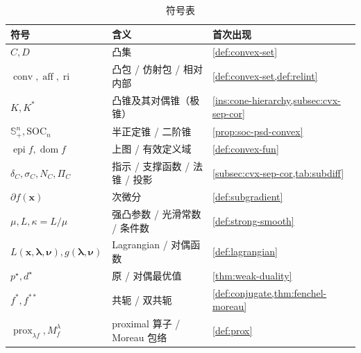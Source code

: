 \begin{table}[H]\centering\small
\caption{符号表}
\label{tab:cvx-symbols}
\begin{tabular}{lll}
\toprule
符号 & 含义 & 首次出现 \\
\midrule
$C,D$ & 凸集 & \cref{def:convex-set} \\
$\operatorname{conv},\operatorname{aff},\operatorname{ri}$ & 凸包 / 仿射包 / 相对内部 & \cref{def:convex-set,def:relint} \\
$K,K^\ast$ & 凸锥及其对偶锥（极锥） & \cref{ins:cone-hierarchy,subsec:cvx-sep-cor} \\
$\mathbb{S}^n_+,\mathrm{SOC}_n$ & 半正定锥 / 二阶锥 & \cref{prop:soc-psd-convex} \\
$\operatorname{epi}f,\operatorname{dom}f$ & 上图 / 有效定义域 & \cref{def:convex-fun} \\
$\delta_C,\sigma_C,N_C,\Pi_C$ & 指示 / 支撑函数 / 法锥 / 投影 & \cref{subsec:cvx-sep-cor,tab:subdiff} \\
$\partial f(\mathbf x)$ & 次微分 & \cref{def:subgradient} \\
$\mu,L,\kappa=L/\mu$ & 强凸参数 / 光滑常数 / 条件数 & \cref{def:strong-smooth} \\
$L(\mathbf x,\boldsymbol\lambda,\boldsymbol\nu),g(\boldsymbol\lambda,\boldsymbol\nu)$ & Lagrangian / 对偶函数 & \cref{def:lagrangian} \\
$p^\star,d^\star$ & 原 / 对偶最优值 & \cref{thm:weak-duality} \\
$f^\ast,f^{\ast\ast}$ & 共轭 / 双共轭 & \cref{def:conjugate,thm:fenchel-moreau} \\
$\operatorname{prox}_{\lambda f},M_f^\lambda$ & proximal 算子 / Moreau 包络 & \cref{def:prox} \\
\bottomrule
\end{tabular}
\end{table}

